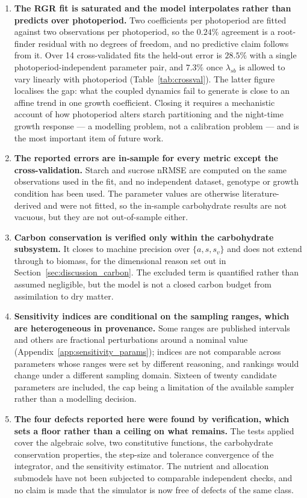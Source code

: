 \documentclass[a4paper,fleqn]{cas-sc}
\begin{document}
\begin{enumerate}\itemsep2pt
\item \textbf{The RGR fit is saturated and the model interpolates rather than predicts over photoperiod.} Two coefficients per photoperiod are fitted against two observations per photoperiod, so the $0.24\%$ agreement is a root-finder residual with no degrees of freedom, and no predictive claim follows from it. Over 14 cross-validated fits the held-out error is $28.5\%$ with a single photoperiod-independent parameter pair, and $7.3\%$ once $\lambda_{sb}$ is allowed to vary linearly with photoperiod (Table~\ref{tab:crossval}). The latter figure localises the gap: what the coupled dynamics fail to generate is close to an affine trend in one growth coefficient. Closing it requires a mechanistic account of how photoperiod alters starch partitioning and the night-time growth response --- a modelling problem, not a calibration problem --- and is the most important item of future work.
\item \textbf{The reported errors are in-sample for every metric except the cross-validation.} Starch and sucrose nRMSE are computed on the same observations used in the fit, and no independent dataset, genotype or growth condition has been used. The parameter values are otherwise literature-derived and were not fitted, so the in-sample carbohydrate results are not vacuous, but they are not out-of-sample either.
\item \textbf{Carbon conservation is verified only within the carbohydrate subsystem.} It closes to machine precision over $\{a,s,s_v\}$ and does not extend through to biomass, for the dimensional reason set out in Section~\ref{sec:discussion_carbon}. The excluded term is quantified rather than assumed negligible, but the model is not a closed carbon budget from assimilation to dry matter.
\item \textbf{Sensitivity indices are conditional on the sampling ranges, which are heterogeneous in provenance.} Some ranges are published intervals and others are fractional perturbations around a nominal value (Appendix~\ref{app:sensitivity_params}); indices are not comparable across parameters whose ranges were set by different reasoning, and rankings would change under a different sampling domain. Sixteen of twenty candidate parameters are included, the cap being a limitation of the available sampler rather than a modelling decision.
\item \textbf{The four defects reported here were found by verification, which sets a floor rather than a ceiling on what remains.} The tests applied cover the algebraic solve, two constitutive functions, the carbohydrate conservation properties, the step-size and tolerance convergence of the integrator, and the sensitivity estimator. The nutrient and allocation submodels have not been subjected to comparable independent checks, and no claim is made that the simulator is now free of defects of the same class.

\end{enumerate}
\end{document}
